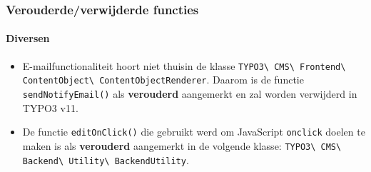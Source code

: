 \begin{frame}[fragile]
	\frametitle{Verouderde/verwijderde functies}
	\framesubtitle{Diversen}

	\begin{itemize}
		\item E-mailfunctionaliteit hoort niet thuisin de klasse\newline
			\small
				\texttt{TYPO3\textbackslash
					CMS\textbackslash
					Frontend\textbackslash
					ContentObject\textbackslash
					ContentObjectRenderer}.\newline
			\normalsize
			Daarom is de functie \texttt{sendNotifyEmail()} als \textbf{verouderd} aangemerkt en zal worden verwijderd in TYPO3 v11.

		\item De functie \texttt{editOnClick()} die gebruikt werd om JavaScript \texttt{onclick} doelen te maken
			is als \textbf{verouderd} aangemerkt in de volgende klasse:\newline
			\small
				\texttt{TYPO3\textbackslash
					CMS\textbackslash
					Backend\textbackslash
					Utility\textbackslash
					BackendUtility}.
			\normalsize

	\end{itemize}

\end{frame}



